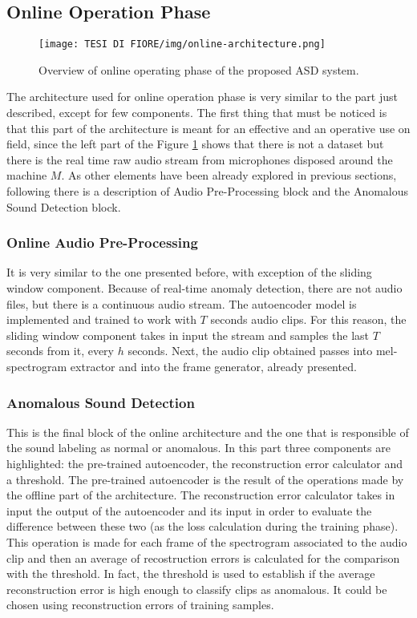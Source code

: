 \subsection{Online Operation Phase}
\begin{figure}[ht]
\texttt{[image: TESI DI FIORE/img/online-architecture.png]}
\centering
\caption{Overview of online operating phase of the proposed ASD system.}
\label{online-asd-system}
\end{figure}
The architecture used for online operation phase is very similar to the part just described, except for few components. The first thing that must be noticed is that this part of the architecture is meant for an effective and an operative use on field, since the left part of the Figure \ref{online-asd-system} shows that there is not a dataset but there is the real time raw audio stream from microphones disposed around the machine $M$. As other elements have been already explored in previous sections, following  there is a description of Audio Pre-Processing block and the Anomalous Sound Detection block. 
\subsubsection{Online Audio Pre-Processing}
It is very similar to the one presented before, with exception of the sliding window component. Because of real-time anomaly detection, there are not audio files, but there is a continuous audio stream. The autoencoder model is implemented and trained to work with $T$ seconds audio clips. For this reason, the sliding window component takes in input the stream and samples the last $T$ seconds from it, every $h$ seconds. Next, the audio clip obtained passes into mel-spectrogram extractor and into the frame generator, already presented. 
\subsubsection{Anomalous Sound Detection}
This is the final block of the online architecture and the one that is responsible of the sound labeling as normal or anomalous. In this part three components are highlighted: the pre-trained autoencoder, the reconstruction error calculator and a threshold. The pre-trained autoencoder is the result of the operations made by the offline part of the architecture. The reconstruction error calculator takes in input the output of the autoencoder and its input in order to evaluate the difference between these two (as the loss calculation during the training phase). This operation is made for each frame of the spectrogram associated to the audio clip and then an average of recostruction errors is calculated for the comparison with the threshold. In fact, the threshold is used to establish if the average reconstruction error is high enough to classify clips as anomalous. It could be chosen using reconstruction errors of training samples.
